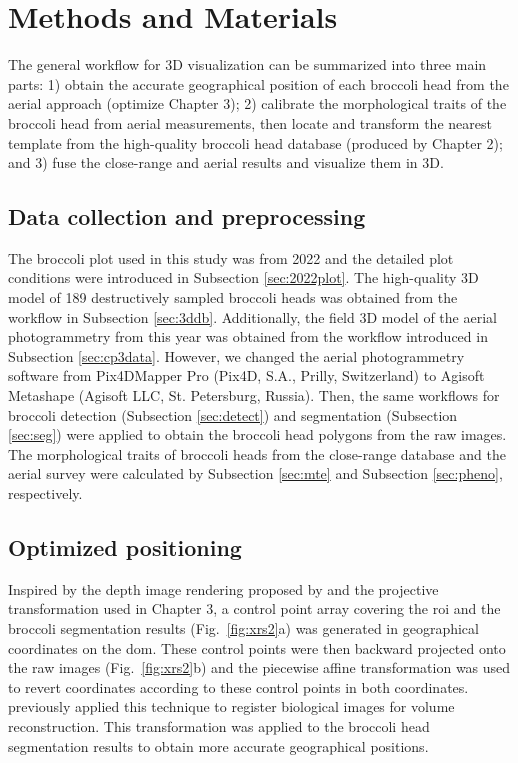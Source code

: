 \section{Methods and Materials}

The general workflow for 3D visualization can be summarized into three main parts: 1) obtain the accurate geographical position of each broccoli head from the aerial approach (optimize Chapter 3); 2) calibrate the morphological traits of the broccoli head from aerial measurements, then locate and transform the nearest template from the high-quality broccoli head database (produced by Chapter 2); and 3) fuse the close-range and aerial results and visualize them in 3D.

\subsection{Data collection and preprocessing}

The broccoli plot used in this study was from 2022 and the detailed plot conditions were introduced in Subsection \ref{sec:2022plot}. The high-quality 3D model of 189 destructively sampled broccoli heads was obtained from the workflow in Subsection \ref{sec:3ddb}. Additionally, the field 3D model of the aerial photogrammetry from this year was obtained from the workflow introduced in Subsection \ref{sec:cp3data}. However, we changed the aerial photogrammetry software from Pix4DMapper Pro (Pix4D, S.A., Prilly, Switzerland) to Agisoft Metashape (Agisoft LLC, St. Petersburg, Russia). Then, the same workflows for broccoli detection (Subsection \ref{sec:detect}) and segmentation (Subsection \ref{sec:seg}) were applied to obtain the broccoli head polygons from the raw images. The morphological traits of broccoli heads from the close-range database and the aerial survey were calculated by Subsection \ref{sec:mte} and Subsection \ref{sec:pheno}, respectively.

\subsection{Optimized positioning}

Inspired by the depth image rendering proposed by \citet{shao_cattle_2020} and the projective transformation used in Chapter 3, a control point array covering the \gls{roi} and the broccoli segmentation results (Fig.~\ref{fig:xrs2}a) was generated in geographical coordinates on the \gls{dom}. These control points were then backward projected onto the raw images (Fig.~\ref{fig:xrs2}b) and the piecewise affine transformation was used to revert coordinates according to these control points in both coordinates. \citet{pitiot_piecewise_2006} previously applied this technique to register biological images for volume reconstruction. This transformation was applied to the broccoli head segmentation results to obtain more accurate geographical positions.

